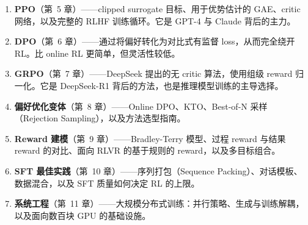 \begin{enumerate}
  \item \textbf{PPO}（第~5 章）——clipped surrogate 目标、用于优势估计的 GAE、critic 网络，以及完整的 RLHF 训练循环。它是 GPT-4 与 Claude 背后的主力。
  \item \textbf{DPO}（第~6 章）——通过将偏好转化为对比式有监督 loss，从而完全绕开 RL。比 online RL 更简单，但灵活性较低。
  \item \textbf{GRPO}（第~7 章）——DeepSeek 提出的无 critic 算法，使用组级 reward 归一化。它是 DeepSeek-R1 背后的方法，也是推理模型训练的主导选择。
  \item \textbf{偏好优化变体}（第~8 章）——Online DPO、KTO、Best-of-N 采样（Rejection Sampling），以及方法选型指南。
  \item \textbf{Reward 建模}（第~9 章）——Bradley-Terry 模型、过程 reward 与结果 reward 的对比、面向 RLVR 的基于规则的 reward，以及多目标组合。
  \item \textbf{SFT 最佳实践}（第~10 章）——序列打包（Sequence Packing）、对话模板、数据混合，以及 SFT 质量如何决定 RL 的上限。
  \item \textbf{系统工程}（第~11 章）——大规模分布式训练：并行策略、生成与训练解耦，以及面向数百块 GPU 的基础设施。
\end{enumerate}

